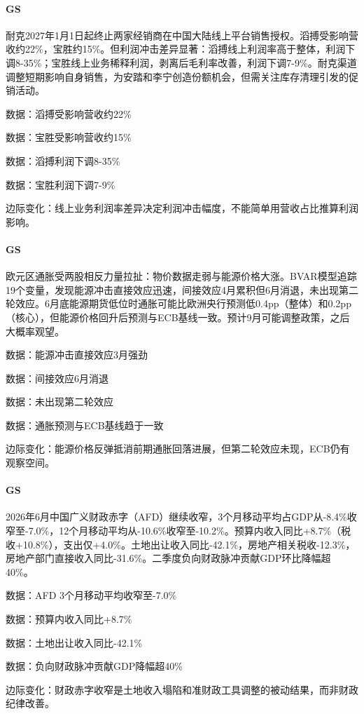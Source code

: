 \documentclass[11pt]{ctexart}
\begin{document}
\paragraph{GS} 耐克2027年1月1日起终止两家经销商在中国大陆线上平台销售授权。滔搏受影响营收约22\%，宝胜约15\%。但利润冲击差异显著：滔搏线上利润率高于整体，利润下调8-35\%；宝胜线上业务稀释利润，剥离后毛利率改善，利润下调7-9\%。耐克渠道调整短期影响自身销售，为安踏和李宁创造份额机会，但需关注库存清理引发的促销活动。
{\small\color{refgray}数据：滔搏受影响营收约22\%\par}
{\small\color{refgray}数据：宝胜受影响营收约15\%\par}
{\small\color{refgray}数据：滔搏利润下调8-35\%\par}
{\small\color{refgray}数据：宝胜利润下调7-9\%\par}
{\small\color{refgray}边际变化：线上业务利润率差异决定利润冲击幅度，不能简单用营收占比推算利润影响。\par}
\paragraph{GS} 欧元区通胀受两股相反力量拉扯：物价数据走弱与能源价格大涨。BVAR模型追踪19个变量，发现能源冲击直接效应迅速，间接效应4月累积但6月消退，未出现第二轮效应。6月底能源期货低位时通胀可能比欧洲央行预测低0.4pp（整体）和0.2pp（核心），但能源价格回升后预测与ECB基线一致。预计9月可能调整政策，之后大概率观望。
{\small\color{refgray}数据：能源冲击直接效应3月强劲\par}
{\small\color{refgray}数据：间接效应6月消退\par}
{\small\color{refgray}数据：未出现第二轮效应\par}
{\small\color{refgray}数据：通胀预测与ECB基线趋于一致\par}
{\small\color{refgray}边际变化：能源价格反弹抵消前期通胀回落进展，但第二轮效应未现，ECB仍有观察空间。\par}
\paragraph{GS} 2026年6月中国广义财政赤字（AFD）继续收窄，3个月移动平均占GDP从-8.4\%收窄至-7.0\%，12个月移动平均从-10.6\%收窄至-10.2\%。预算内收入同比+8.7\%（税收+10.8\%），支出仅+4.0\%。土地出让收入同比-42.1\%，房地产相关税收-12.3\%，房地产部门直接收入同比-31.6\%。二季度负向财政脉冲贡献GDP环比降幅超40\%。
{\small\color{refgray}数据：AFD 3个月移动平均收窄至-7.0\%\par}
{\small\color{refgray}数据：预算内收入同比+8.7\%\par}
{\small\color{refgray}数据：土地出让收入同比-42.1\%\par}
{\small\color{refgray}数据：负向财政脉冲贡献GDP降幅超40\%\par}
{\small\color{refgray}边际变化：财政赤字收窄是土地收入塌陷和准财政工具调整的被动结果，而非财政纪律改善。\par}
\end{document}
